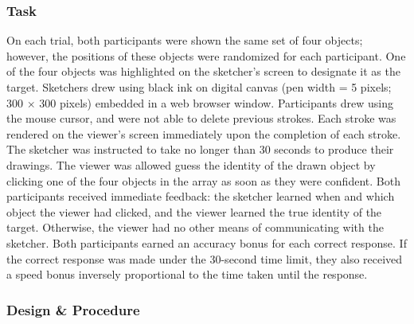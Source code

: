 \documentclass[10pt,letterpaper]{article}
\begin{document}
\subsubsection{Task} 

On each trial, both participants were shown the same set of four objects; however, the positions of these objects were randomized for each participant. 
One of the four objects was highlighted on the sketcher's screen to designate it as the target.
Sketchers drew using black ink on digital canvas (pen width = 5 pixels; 300 $\times$ 300 pixels) embedded in a web browser window. 
Participants drew using the mouse cursor, and were not able to delete previous strokes. 
Each stroke was rendered on the viewer's screen immediately upon the completion of each stroke.
The sketcher was instructed to take no longer than 30 seconds to produce their drawings. 
The viewer was allowed guess the identity of the drawn object by clicking one of the four objects in the array as soon as they were confident. 
Both participants received immediate feedback: the sketcher learned when and which object the viewer had clicked, and the viewer learned the true identity of the target. 
Otherwise, the viewer had no other means of communicating with the sketcher. 
Both participants earned an accuracy bonus for each correct response. 
If the correct response was made under the 30-second time limit, they also received a speed bonus inversely proportional to the time taken until the response.



\subsubsection{Design \& Procedure} 
\end{document}
